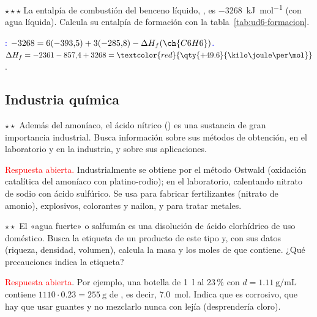 \begin{exercise}
    \(\star\star\star\) La entalpía de combustión del benceno líquido, , es \qty{-3268}{\kilo\joule\per\mol} (con agua
    líquida). Calcula su entalpía de formación con la tabla~\ref{tab:ud6-formacion}.
    \begin{solu}
        \textcolor{blue}{: \(-3268 = 6(-393{,}5) + 3(-285{,}8) - \Delta H_f(\ch{C6H6})\).}
        \(\Delta H_f = -2361 - 857{,}4 + 3268 = \textcolor{red}{\qty{+49.6}{\kilo\joule\per\mol}}\).
    \end{solu}
\end{exercise}

\subsection{Industria química}

\begin{exercise}
    \(\star\star\) Además del amoníaco, el ácido nítrico () es una sustancia de gran importancia industrial. Busca
    información sobre sus métodos de obtención, en el laboratorio y en la industria, y sobre sus aplicaciones.
    \begin{solu}
        \textcolor{red}{Respuesta abierta.} Industrialmente se obtiene por el método Ostwald (oxidación catalítica del amoníaco con
        platino-rodio); en el laboratorio, calentando nitrato de sodio con ácido sulfúrico. Se usa para fabricar fertilizantes
        (nitrato de amonio), explosivos, colorantes y nailon, y para tratar metales.
    \end{solu}
\end{exercise}

\begin{exercise}
    \(\star\star\) El «agua fuerte» o salfumán es una disolución de ácido clorhídrico de uso doméstico. Busca la etiqueta de un
    producto de este tipo y, con sus datos (riqueza, densidad, volumen), calcula la masa y los moles de  que contiene.
    ¿Qué precauciones indica la etiqueta?
    \begin{solu}
        \textcolor{red}{Respuesta abierta}. Por ejemplo, una botella de \qty{1}{\litre} al 23\,\% con \(d = \qty{1.11}{\gram\per\mL}\)
        contiene \(1110 \cdot \num{0.23} = \qty{255}{\gram}\) de , es decir, \qty{7.0}{\mol}. Indica que es corrosivo,
        que hay que usar guantes y no mezclarlo nunca con lejía (desprendería cloro).
    \end{solu}
\end{exercise}

